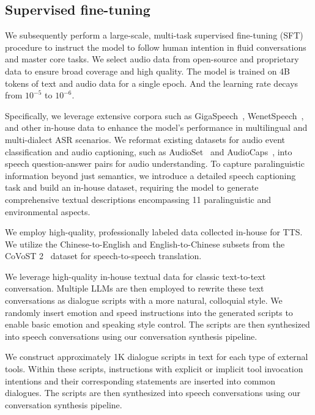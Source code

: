 \subsection{Supervised fine-tuning}

We subsequently perform a large-scale, multi-task supervised fine-tuning (SFT) procedure \cite{wei2021finetuned} to
instruct the model
to follow human intention in fluid conversations
and master core tasks.
We select audio data 
from open-source and proprietary data to ensure broad coverage and high quality.
The model is trained on 4B tokens of text and audio data for a single epoch.
And the learning rate decays from $10^{-5}$ to $10^{-6}$.

Specifically, we leverage extensive corpora such as 
GigaSpeech~\cite{gigaspeech}, 
WenetSpeech~\cite{zhang2022wenetspeech10000hoursmultidomain}, 
and other in-house data to enhance the model's performance in multilingual and multi-dialect ASR scenarios.
We reformat existing datasets for audio event classification and audio captioning, such as AudioSet~\cite{7952261} and AudioCaps~\cite{kim2019audiocaps}, into speech question-answer pairs for audio understanding.
To capture paralinguistic information beyond just semantics, we introduce a detailed speech captioning task and build an in-house dataset, requiring the model to generate comprehensive textual descriptions encompassing 11 paralinguistic and environmental aspects.


We employ high-quality, professionally labeled data collected in-house for TTS. We utilize the Chinese-to-English and English-to-Chinese subsets from the CoVoST 2~\cite{wang2020covost2massivelymultilingual} dataset for speech-to-speech translation.

We leverage high-quality in-house textual data for classic text-to-text conversation.
Multiple LLMs are then employed to rewrite these text conversations as dialogue scripts with a more natural, colloquial style. We randomly insert emotion and speed instructions into the generated scripts to enable basic emotion and speaking style control. 
The scripts are then synthesized into speech conversations using our conversation synthesis pipeline.

We construct approximately 1K dialogue scripts in text for each type of external tools.
Within these scripts, instructions with explicit or implicit tool invocation intentions and their corresponding statements are inserted into common dialogues. The scripts are then synthesized into speech conversations using our conversation synthesis pipeline.


